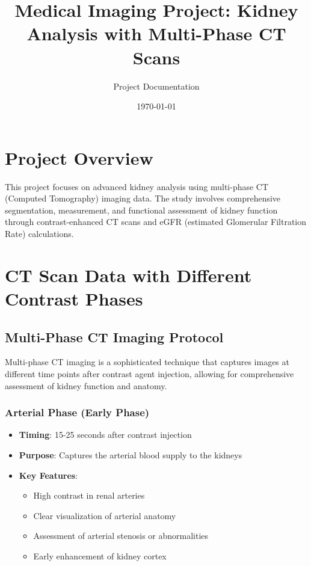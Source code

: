 \documentclass{article}
\title{Medical Imaging Project: Kidney Analysis with Multi-Phase CT Scans}
\author{Project Documentation}
\date{\today}
\begin{document}
\maketitle

\section{Project Overview}

This project focuses on advanced kidney analysis using multi-phase CT (Computed Tomography) imaging data. The study involves comprehensive segmentation, measurement, and functional assessment of kidney function through contrast-enhanced CT scans and eGFR (estimated Glomerular Filtration Rate) calculations.

\section{CT Scan Data with Different Contrast Phases}

\subsection{Multi-Phase CT Imaging Protocol}

Multi-phase CT imaging is a sophisticated technique that captures images at different time points after contrast agent injection, allowing for comprehensive assessment of kidney function and anatomy.

\subsubsection{Arterial Phase (Early Phase)}
\begin{itemize}
    \item \textbf{Timing}: 15-25 seconds after contrast injection
    \item \textbf{Purpose}: Captures the arterial blood supply to the kidneys
    \item \textbf{Key Features}:
    \begin{itemize}
        \item High contrast in renal arteries
        \item Clear visualization of arterial anatomy
        \item Assessment of arterial stenosis or abnormalities
        \item Early enhancement of kidney cortex
    \end{itemize}
\end{itemize}
\end{document}
